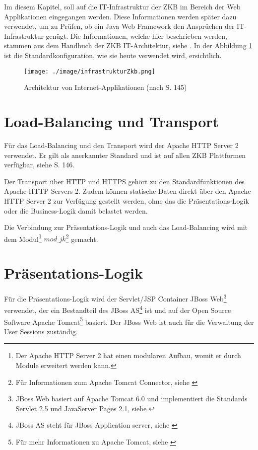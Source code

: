   Im diesem Kapitel, soll auf die IT-Infrastruktur der \ac{ZKB} im Bereich der
  Web Applikationen eingegangen werden. Diese Informationen werden später dazu
  verwendet, um zu Prüfen, ob ein Java Web Framework den Ansprüchen der
  IT-Infrastruktur genügt. Die Informationen, welche hier beschrieben werden,
  stammen aus dem Handbuch der ZKB IT-Architektur, siehe
  \cite{ZkbHandbuchDerItArchitektur}. In der Abbildung
  \ref{img:infrastrukturZkb} ist die Standardkonfiguration, wie sie heute
  verwendet wird, ersichtlich.
  
  \begin{figure}[ht]
    \begin{center}
      \texttt{[image: ./image/infrastrukturZkb.png]}
      \caption{Architektur von Internet-Applikationen (nach
      \cite{ZkbHandbuchDerItArchitektur} S. 145)}
      \label{img:infrastrukturZkb}
    \end{center}
  \end{figure}
  
  \section{Load-Balancing und Transport}
  
  Für das Load-Balancing und den Transport wird der Apache HTTP Server 2
  verwendet. Er gilt als anerkannter Standard und ist auf allen ZKB Plattformen
  verfügbar, siehe \cite{ZkbHandbuchDerItArchitektur} S. 146.
  
  Der Transport über \ac{HTTP} und \ac{HTTPS} gehört zu den Standardfunktionen
  des Apache HTTP Servers 2. Zudem können statische Daten direkt über den Apache HTTP
  Server 2 zur Verfügung gestellt werden, ohne das die Präsentations-Logik oder
  die Business-Logik damit belastet werden.
  
  Die Verbindung zur Präsentations-Logik und auch das Load-Balancing wird mit
  dem Modul\footnote{Der Apache HTTP Server 2 hat einen modularen Aufbau, womit
  er durch Module erweitert werden kann.} \(mod\_jk\)\footnote{Für
  Informationen zum Apache Tomcat Connector, siehe \cite{ModJk}} gemacht.
  
  \section{Präsentations-Logik}
  
  Für die Präsentations-Logik wird der Servlet/JSP Container JBoss
  Web\footnote{JBoss Web basiert auf Apache Tomcat 6.0 und implementiert die
  Standards Servlet 2.5 und JavaServer Pages 2.1, siehe \cite{JBossWeb}}
  verwendet, der ein Bestandteil des JBoss AS\footnote{JBoss AS steht für JBoss
  Application server, siehe \cite{JBossAS}} ist und auf der Open Source Software
  Apache Tomcat\footnote{Für mehr Informationen zu Apache Tomcat, siehe
  \cite{ApacheTomcat}} basiert. Der JBoss Web ist auch für die Verwaltung der
  User Sessions zuständig.
  
